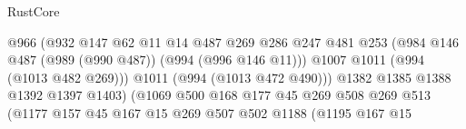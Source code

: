 \begin{lexlean}{RustCore}
\begin{coremodule}
                                              @966
                                              (@932
                                                @147
                                                @62
                                                @11
                                                @14
                                                @487
                                                @269
                                                @286
                                                @247
                                                @481
                                                @253
                                                (@984
                                                  @146
                                                  @487
                                                  (@989 (@990 @487))
                                                  (@994 (@996 @146 @11)))
                                                @1007
                                                @1011
                                                (@994 (@1013 @482 @269)))
                                              @1011
                                              (@994 (@1013 @472 @490)))
                                            @1382
                                            @1385
                                            @1388
                                            @1392
                                            @1397
                                            @1403)
                                          (@1069
                                            @500
                                            @168
                                            @177
                                            @45
                                            @269
                                            @508
                                            @269
                                            @513
                                            (@1177
                                              @157
                                              @45
                                              @167
                                              @15
                                              @269
                                              @507
                                              @502
                                              @1188
                                              (@1195
                                                @167
                                                @15

\end{coremodule}
\end{lexlean}
